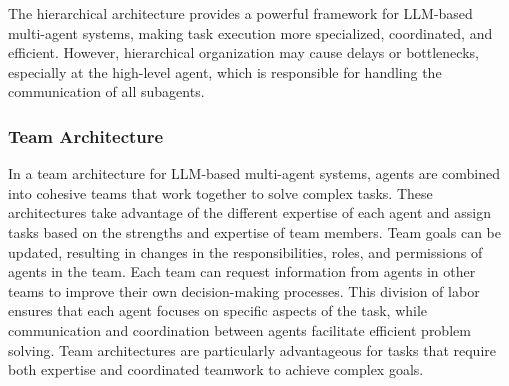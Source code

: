 The hierarchical architecture provides a powerful framework for LLM-based multi-agent systems, making task execution more specialized, coordinated, and efficient. However, hierarchical organization may cause delays or bottlenecks, especially at the high-level agent, which is responsible for handling the communication of all subagents.

\subsubsection{Team Architecture}

In a team architecture for LLM-based multi-agent systems, agents are combined into cohesive teams that work together to solve complex tasks. These architectures take advantage of the different expertise of each agent and assign tasks based on the strengths and expertise of team members. Team goals can be updated, resulting in changes in the responsibilities, roles, and permissions of agents in the team. Each team can request information from agents in other teams to improve their own decision-making processes. This division of labor ensures that each agent focuses on specific aspects of the task, while communication and coordination between agents facilitate efficient problem solving. Team architectures are particularly advantageous for tasks that require both expertise and coordinated teamwork to achieve complex goals.

